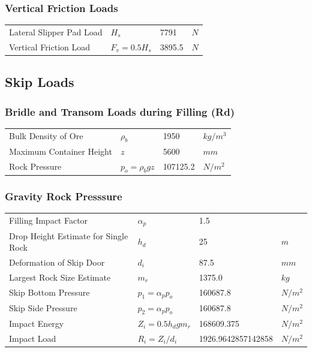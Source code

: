 \documentclass{article}%
\begin{document}
%
\subsubsection{Vertical Friction Loads}%
\label{ssubsec:VerticalFrictionLoads}%
\begin{flushleft}%
\begin{minipage}{\textwidth}%
\flushleft%
\begin{tabular}{l l l l}%
Lateral Slipper Pad Load&$H_s$&7791&$N$\\%
Vertical Friction Load&$F_v = 0.5 H_s$&3895.5&$N$\\%
\end{tabular}%
\end{minipage}%
\end{flushleft}

%
\subsection{Skip Loads}%
\label{subsec:SkipLoads}%
\subsubsection{Bridle and Transom Loads during Filling (Rd)}%
\label{ssubsec:BridleandTransomLoadsduringFilling(Rd)}%
\begin{flushleft}%
\begin{minipage}{\textwidth}%
\flushleft%
\begin{tabular}{l l l l}%
Bulk Density of Ore&$\rho_b$&1950&$kg/m^3$\\%
Maximum Container Height&$z$&5600&$mm$\\%
Rock Pressure&$p_o = \rho_b g z$&107125.2&$N/m^2$\\%
\end{tabular}%
\end{minipage}%
\end{flushleft}

%
\subsubsection{Gravity Rock Presssure}%
\label{ssubsec:GravityRockPresssure}%
\begin{flushleft}%
\begin{minipage}{\textwidth}%
\flushleft%
\begin{tabular}{l l l l}%
Filling Impact Factor&$\alpha_p$&1.5&\\%
Drop Height Estimate for Single Rock&$h_d$&25&$m$\\%
Deformation of Skip Door&$d_i$&87.5&$mm$\\%
Largest Rock Size Estimate&$m_r$&1375.0&$kg$\\%
Skip Bottom Pressure&$p_1 = \alpha_p p_o$&160687.8&$N/m^2$\\%
Skip Side Pressure&$p_2 = \alpha_p p_o$&160687.8&$N/m^2$\\%
Impact Energy&$Z_i = 0.5 h_d g m_r$&168609.375&$N/m^2$\\%
Impact Load&$R_i = Z_i/d_i$&1926.9642857142858&$N/m^2$\\%
\end{tabular}%
\end{minipage}%
\end{flushleft}
\end{document}
